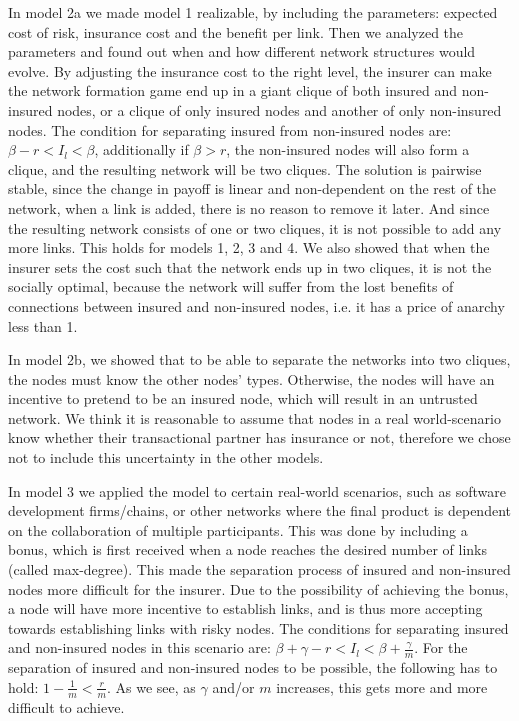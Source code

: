 In model 2a we made model 1 realizable, by including the parameters: expected cost of risk, insurance cost and the benefit per link. Then we analyzed the parameters and found out when and how different network structures would evolve. By adjusting the insurance cost to the right level, the insurer can make the network formation game end up in a giant clique of both insured and non-insured nodes, or a clique of only insured nodes and another of only non-insured nodes. The condition for separating insured from non-insured nodes are: $\beta-r<I_{l}<\beta$, additionally if $\beta>r$, the non-insured nodes will also form a clique, and the resulting network will be two cliques. The solution is pairwise stable, since the change in payoff is linear and non-dependent on the rest of the network, when a link is added, there is no reason to remove it later. And since the resulting network consists of one or two cliques, it is not possible to add any more links. This holds for models 1, 2, 3 and 4.
We also showed that when the insurer sets the cost such that the network ends up in two cliques, it is not the socially optimal, because the network will suffer from the lost benefits of connections between insured and non-insured nodes, i.e. it has a price of anarchy less than 1.


In model 2b, we showed that to be able to separate the networks into two cliques, the nodes must know the other nodes' types. Otherwise, the nodes will have an incentive to pretend to be an insured node, which will result in an untrusted network. We think it is reasonable to assume that nodes in a real world-scenario know whether their transactional partner has insurance or not, therefore we chose not to include this uncertainty in the other models.

In model 3 we applied the model to certain real-world scenarios, such as software development firms/chains, or other networks where the final product is dependent on the collaboration of multiple participants.
This was done by including a bonus, which is first received when a node reaches the desired number of links (called max-degree). This made the separation process of insured and non-insured nodes more difficult for the insurer. Due to the possibility of achieving the bonus, a node will have more incentive to establish links, and is thus more accepting towards establishing links with risky nodes. The conditions for separating insured and non-insured nodes in this scenario are: $\beta+\gamma-r<I_{l}<\beta+\frac{\gamma}{m}$. For the separation of insured and non-insured nodes to be possible, the following has to hold: $1-\frac{1}{m}<\frac{r}{m}$. As we see, as $\gamma$ and/or $m$ increases, this gets more and more difficult to achieve. 

